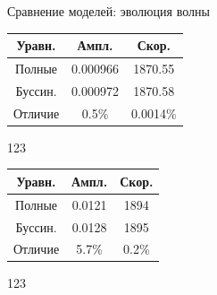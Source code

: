 \documentclass[usenames,dvipsnames]{beamer}
\begin{document}
\begin{frame}{Сравнение моделей: эволюция волны}
\footnotesize
\begin{minipage}{\textwidth}
	\begin{minipage}[b]{0.6\textwidth}
	\end{minipage}
	\hfill
	\begin{minipage}[b]{0.39\textwidth}
		\begin{tabular}{|c|c|c|}
			\hline 
			Уравн. & Ампл. & Скор.  \\ 
			\hline 
			Полные & 0.000966 & 1870.55 \\ 
			\hline 
			Буссин. & 0.000972 & 1870.58 \\ 
			\hline
			Отличие & 0.5\% & 0.0014\% \\
			\hline
		\end{tabular}
	 {\color{white}\vspace{2mm}123}
	\end{minipage}
\end{minipage}

\vspace{2mm}
\begin{minipage}{\textwidth}
	\begin{minipage}[b]{0.6\textwidth}
	\end{minipage}
	\hfill
	\begin{minipage}[b]{0.39\textwidth}
		\centering
		\begin{tabular}{|c|c|c|}
			\hline 
			Уравн. & Ампл. & Скор.  \\ 
			\hline 
			Полные & 0.0121 & 1894 \\ 
			\hline 
			Буссин. & 0.0128 & 1895 \\ 
			\hline 
			Отличие & 5.7\% & 0.2\% \\
			\hline
		\end{tabular}
		{\color{white}\vspace{2mm}123}
	\end{minipage}
\end{minipage}


\end{frame}
\end{document}
